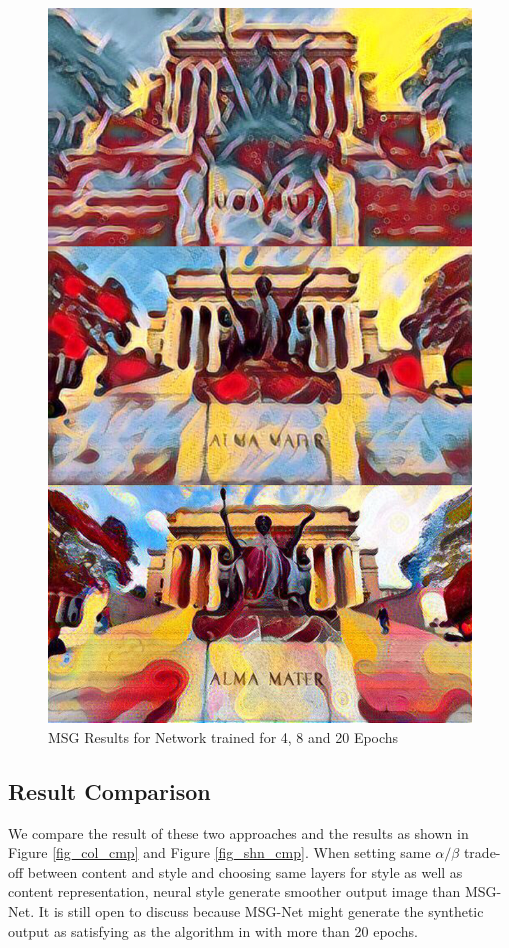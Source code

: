\documentclass[10pt,twocolumn,letterpaper]{article}
\begin{document}
\begin{figure}[t]
\begin{center}
\includegraphics[width=0.6\linewidth]{images/msg_epoch_combine.jpg}
\end{center}
\caption{MSG Results for Network trained for 4, 8 and 20 Epochs}
\label{fig:long}
\label{fig:onecol}
\label{fig_msg}
\end{figure}

\subsection{Result Comparison}

We compare the result of these two approaches and the results as shown in Figure \ref{fig_col_cmp} and Figure \ref{fig_shn_cmp}. When setting same $\alpha / \beta$ trade-off between content and style and choosing same layers for style as well as content representation, neural style generate smoother output image than MSG-Net. It is still open to discuss because MSG-Net might generate the synthetic output as satisfying as the algorithm in \cite{Authors01} with more than 20 epochs.
\end{document}

